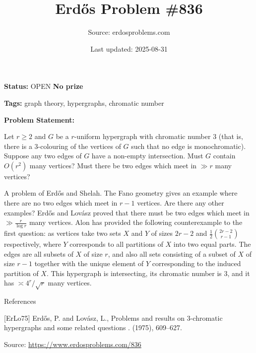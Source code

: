 \documentclass{article}
\title{Erd\H{o}s Problem \#836}
\date{Last updated: 2025-08-31}
\author{Source: erdosproblems.com}
\begin{document}
\maketitle

\noindent\textbf{Status:} OPEN \quad \textbf{No prize}

\noindent\textbf{Tags:} graph theory, hypergraphs, chromatic number

\medskip

\noindent\textbf{Problem Statement:}

Let $r\geq 2$ and $G$ be a $r$-uniform hypergraph with chromatic number $3$ (that is, there is a $3$-colouring of the vertices of $G$ such that no edge is monochromatic). Suppose any two edges of $G$ have a non-empty intersection. Must $G$ contain $O(r^2)$ many vertices? Must there be two edges which meet in $\gg r$ many vertices?




A problem of Erd\H{o}s and Shelah. The Fano geometry gives an example where there are no two edges which meet in $r-1$ vertices. Are there any other examples? Erd\H{o}s and Lov\'{a}sz \cite{ErLo75} proved that there must be two edges which meet in $\gg \frac{r}{\log r}$ many vertices. Alon has provided the following counterexample to the first question: as vertices take two sets $X$ and $Y$ of sizes $2r-2$ and $\frac{1}{2}\binom{2r-2}{r-1}$ respectively, where $Y$ corresponds to all partitions of $X$ into two equal parts. The edges are all subsets of $X$ of size $r$, and also all sets consisting of a subset of $X$ of size $r-1$ together with the unique element of $Y$ corresponding to the induced partition of $X$. This hypergraph is intersecting, its chromatic number is $3$, and it has $\asymp 4^r/\sqrt{r}$ many vertices.




References

[ErLo75] Erd\H{o}s, P. and Lov\'{a}sz, L., Problems and results on {$3$}-chromatic hypergraphs and some related questions . (1975), 609--627.


\bigskip
\noindent\small{Source: \url{https://www.erdosproblems.com/836}}
\end{document}
